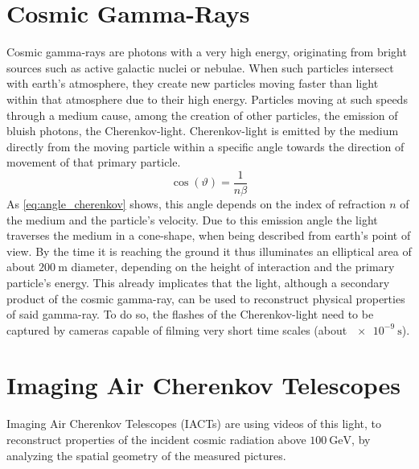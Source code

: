 \section{Cosmic Gamma-Rays}
%
Cosmic gamma-rays are photons with a very high energy, originating from bright
sources such as active galactic nuclei or nebulae. When such particles intersect
with earth's atmosphere, they create new particles moving faster than light
within that atmosphere due to their high energy. Particles moving at such
speeds through a medium cause, among the creation of other particles, the
emission of bluish photons, the Cherenkov-light.
Cherenkov-light is emitted by the medium directly from the moving particle
within a specific angle towards the direction of movement of that primary
particle.
%
\begin{equation}
    \cos(\vartheta) = \frac{1}{n\beta}
    \label{eq:angle_cherenkov}
\end{equation}
%
As \autoref{eq:angle_cherenkov} shows, this angle depends on the index of
refraction $n$ of the medium and the particle's velocity. Due to this emission
angle the light traverses the medium in a cone-shape, when being described from
earth's point of view. By the time it is reaching the ground it thus
illuminates an elliptical area of about $\SI{200}{\meter}$ diameter, depending
on the height of interaction and the primary particle's energy.
This already implicates that the light, although a secondary product of the
cosmic gamma-ray, can be used to reconstruct physical properties of
said gamma-ray. To do so, the flashes of the Cherenkov-light need to
be captured by cameras capable of filming very short time scales (about
$\SI{e-9}{\second}$).

\section{Imaging Air Cherenkov Telescopes}

Imaging Air Cherenkov Telescopes (IACTs) are using videos of this light, to
reconstruct properties of the incident cosmic radiation above
$\SI{100}{\giga\electronvolt}$, by analyzing the spatial geometry of the
measured pictures.

